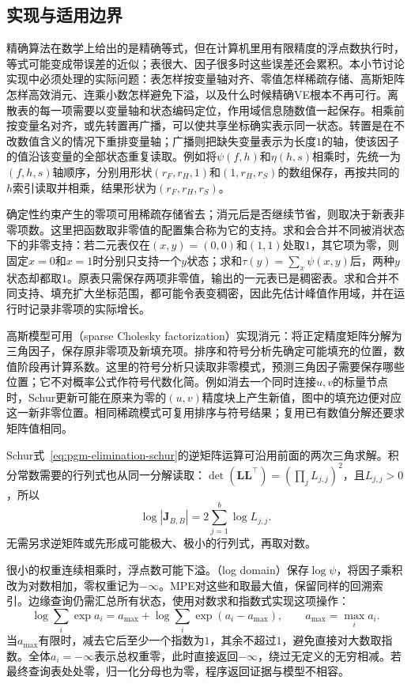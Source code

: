 \subsection{实现与适用边界}
\label{sec:pgm-elimination-implementation}

精确算法在数学上给出的是精确等式，但在计算机里用有限精度的浮点数执行时，等式可能变成带误差的近似；表很大、因子很多时这些误差还会累积。本小节讨论实现中必须处理的实际问题：表怎样按变量轴对齐、零值怎样稀疏存储、高斯矩阵怎样高效消元、连乘小数怎样避免下溢，以及什么时候精确VE根本不再可行。离散表的每一项需要以变量轴和状态编码定位，作用域信息随数值一起保存。相乘前按变量名对齐，或先转置再广播，可以使共享坐标确实表示同一状态。转置是在不改数值含义的情况下重排变量轴；广播则把缺失变量表示为长度$1$的轴，使该因子的值沿该变量的全部状态重复读取。例如将$\psi(f,h)$和$\eta(h,s)$相乘时，先统一为$(f,h,s)$轴顺序，分别用形状$(r_F,r_H,1)$和$(1,r_H,r_S)$的数组保存，再按共同的$h$索引读取并相乘，结果形状为$(r_F,r_H,r_S)$。

确定性约束产生的零项可用稀疏存储省去；消元后是否继续节省，则取决于新表非零项数。这里把函数取非零值的配置集合称为它的支持。求和会合并不同被消状态下的非零支持：若二元表仅在$(x,y)=(0,0)$和$(1,1)$处取$1$，其它项为零，则固定$x=0$和$x=1$时分别只支持一个$y$状态；求和$\tau(y)=\sum_x\psi(x,y)$后，两种$y$状态却都取$1$。原表只需保存两项非零值，输出的一元表已是稠密表。求和合并不同支持、填充扩大坐标范围，都可能令表变稠密，因此先估计峰值作用域，并在运行时记录非零项的实际增长。

高斯模型可用（sparse Cholesky factorization）实现消元：将正定精度矩阵分解为三角因子，保存原非零项及新填充项。排序和符号分析先确定可能填充的位置，数值阶段再计算系数。这里的符号分析只读取非零模式，预测三角因子需要保存哪些位置；它不对概率公式作符号代数化简。例如消去一个同时连接$u,v$的标量节点时，Schur更新可能在原来为零的$(u,v)$精度块上产生新值，图中的填充边便对应这一新非零位置。相同稀疏模式可复用排序与符号结果；复用已有数值分解还要求矩阵值相同。

Schur式~\eqref{eq:pgm-elimination-schur}的逆矩阵运算可沿用前面的两次三角求解。积分常数需要的行列式也从同一分解读取：$\det(\bm{L}\bm{L}^{\top})=(\prod_j L_{j,j})^2$，且$L_{j,j}>0$，所以
\[
  \log|\bm{J}_{B,B}|=2\sum_{j=1}^{b}\log L_{j,j}.
\]
无需另求逆矩阵或先形成可能极大、极小的行列式，再取对数。

很小的权重连续相乘时，浮点数可能下溢。（log domain）保存$\log\psi$，将因子乘积改为对数相加，零权重记为$-\infty$。MPE对这些和取最大值，保留同样的回溯索引。边缘查询仍需汇总所有状态，使用对数求和指数式实现这项操作：
\begin{equation}
  \log\sum_i\exp a_i
  =a_{\max}+\log\sum_i\exp(a_i-a_{\max}),
  \qquad a_{\max}=\max_i a_i.
  \label{eq:pgm-elimination-logsumexp}
\end{equation}
当$a_{\max}$有限时，减去它后至少一个指数为$1$，其余不超过$1$，避免直接对大数取指数。全体$a_i=-\infty$表示总权重零，此时直接返回$-\infty$，绕过无定义的无穷相减。若最终查询表处处零，归一化分母也为零，程序返回证据与模型不相容。

